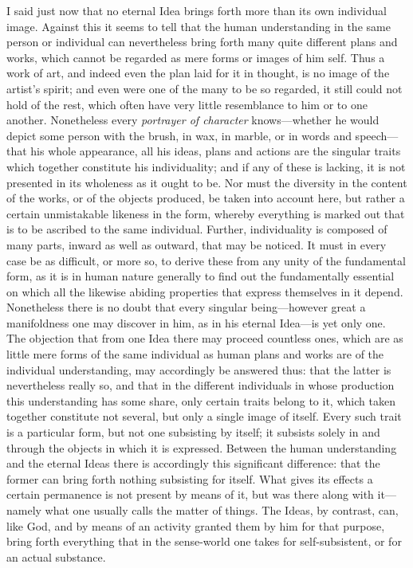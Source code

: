 \documentclass[12pt,a4paper]{article}
\begin{document}
I said just now that no eternal Idea brings forth more than its own individual
image. Against this it seems to tell that the human understanding in the same
person or individual can nevertheless bring forth many quite different plans and
works, which cannot be regarded as mere forms or images of him
self. Thus a work of art, and indeed even the plan laid for it in thought, is no
image of the artist's spirit; and even were one of the many to be so regarded, it
still could not hold of the rest, which often have very little resemblance to him
or to one another. Nonetheless every \emph{portrayer of character} knows---whether
he would depict some person with the brush, in wax, in marble, or in words and
speech---that his whole appearance, all his ideas, plans and actions are the
singular traits which together constitute his individuality; and if any of these
is lacking, it is not presented in its wholeness as it ought to be. Nor must the
diversity in the content of the works, or of the objects produced, be taken into
account here, but rather a certain unmistakable likeness in the form, whereby
everything is marked out that is to be ascribed to the same individual. Further,
individuality is composed of many parts, inward as well as outward, that may be
noticed. It must in every case be as difficult, or more so, to derive these from
any unity of the fundamental form, as it is in human nature generally to find out
the fundamentally essential on which all the likewise abiding properties that
express themselves in it depend. Nonetheless there is no doubt that every singular
being---however great a manifoldness one may discover in him, as in his eternal
Idea---is yet only one. The objection that from one Idea there may proceed countless
ones, which are as little
mere forms of the same individual as human plans and works are of the individual
understanding, may accordingly be answered thus: that the latter is nevertheless
really so, and that in the different individuals in whose production this
understanding has some share, only certain traits belong to it, which taken
together constitute not several, but only a single image of itself. Every such
trait is a particular form, but not one subsisting by itself; it subsists solely
in and through the objects in which it is expressed. Between the human
understanding and the eternal Ideas there is accordingly this significant
difference: that the former can bring forth nothing subsisting for itself. What
gives its effects a certain permanence is not present by means of it, but was there
along with it---namely what one usually calls the matter of things. The Ideas, by
contrast, can, like God, and by means of an activity granted them by him for that
purpose, bring forth everything that in the sense-world one takes for
self-subsistent, or for an actual substance.
\end{document}
